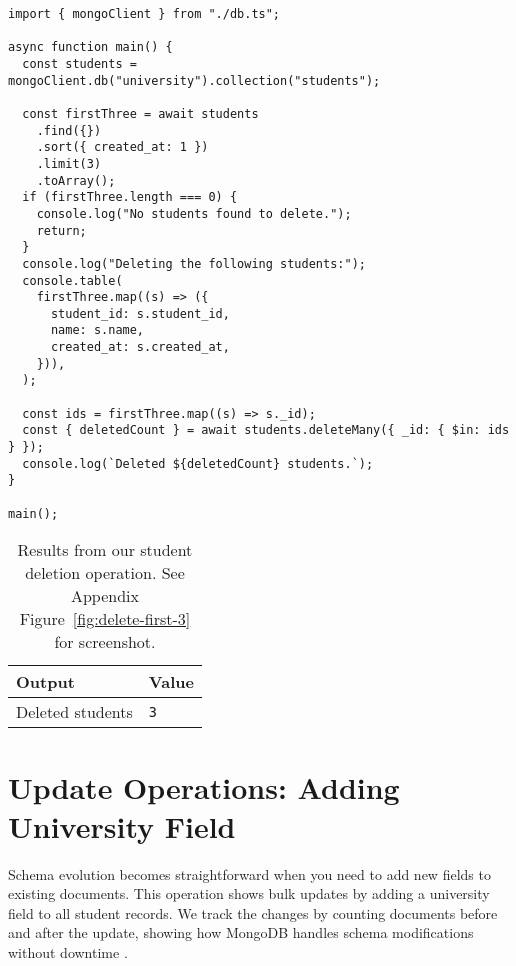 \begin{verbatim}
import { mongoClient } from "./db.ts";

async function main() {
  const students = mongoClient.db("university").collection("students");

  const firstThree = await students
    .find({})
    .sort({ created_at: 1 })
    .limit(3)
    .toArray();
  if (firstThree.length === 0) {
    console.log("No students found to delete.");
    return;
  }
  console.log("Deleting the following students:");
  console.table(
    firstThree.map((s) => ({
      student_id: s.student_id,
      name: s.name,
      created_at: s.created_at,
    })),
  );

  const ids = firstThree.map((s) => s._id);
  const { deletedCount } = await students.deleteMany({ _id: { $in: ids } });
  console.log(`Deleted ${deletedCount} students.`);
}

main();
\end{verbatim}

\begin{table}[H]
  \centering
  \begin{tabular}{|l|l|}
    \hline
    \textbf{Output} & \textbf{Value} \\
    \hline
    Deleted students & \texttt{3} \\
    \hline
  \end{tabular}
  \caption{Results from our student deletion operation. See Appendix Figure~\ref{fig:delete-first-3} for screenshot.}
\end{table}

\section{Update Operations: Adding University Field}
Schema evolution becomes straightforward when you need to add new fields to existing documents. This operation shows bulk updates by adding a university field to all student records. We track the changes by counting documents before and after the update, showing how MongoDB handles schema modifications without downtime \parencite{mongodb_architecture}.

